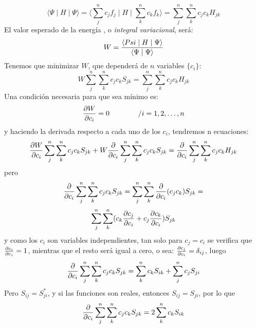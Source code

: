 \documentclass[a4paper,openright,12pt, oneside]{book}
\newcommand{\prointerno}[2]{\langle #1 \mid #2 \rangle}
\newcommand{\prointernot}[3]{\langle #1 \mid #2 \mid #3 \rangle}
\begin{document}
\begin{displaymath}
\prointernot{\Psi}{H}{\Psi} = \prointernot{\sum^{n}_{j} c_{j}f_{j}}{H} {\sum^{n}_{k} c_{k}f_{k}} = \sum^{n}_{j} \sum^{n}_{k} c_{j} c_{k} H_{jk}
\end{displaymath}
El valor esperado de la energ\'ia , o \emph{integral variacional}, ser\'a:
\begin{displaymath}W = { \prointernot{Psi}{H}{\Psi} \over \prointerno{\Psi}{\Psi} } \end{displaymath}
Tenemos que minimizar $W$, que depender\'a de $n$ variables $\{c_{i}\}$:
\begin{displaymath}W \sum^{n}_{j} \sum^{n}_{k} c_{j} c_{k} S_{jk} = \sum^{n}_{j}
\sum^{n}_{k} c_{j} c_{k} H_{jk} \end{displaymath}
Una condici\'on necesaria para que sea m\'inimo es:
\begin{displaymath}{\partial W\over \partial c_{i}} = 0 \qquad \qquad / i = 1,2,\ldots ,n \end{displaymath}
y haciendo la derivada respecto a cada uno de los $c_{i}$, tendremos n ecuaciones:
\begin{displaymath}{
    {\partial W \over \partial c_{i}} \sum^{n}_{j} \sum^{n}_{k} c_j c_k S_{jk} + W {\partial \over \partial c_{i}}}
\sum^{n}_{j} \sum^{n}_{k} c_{j} c_{k} S_{jk} =  {{ \partial \over \partial c_i} \sum^{n}_{j} \sum^{n}_{k} c_{j} c_{k} H_{jk}}
\end{displaymath}
pero
\begin{displaymath}
{\partial \over \partial c_{i}} \sum^{n}_{j} \sum^{n}_{k} c_{j} c_{k}
S_{jk} = \sum^{n}_{j} \sum^{n}_{k} {\partial \over \partial c_{i}}
(c_{j} c_{k}) S_{jk} =
\end{displaymath}
\begin{displaymath}
\sum^{n}_{j} \sum^{n}_{k} (c_{k}{\partial c_j\over \partial c_{i}}
+ c_{j} {\partial c_k\over \partial c_{i}} ) S_{jk}
\end{displaymath}
y como los $c_{i}$ son variables independientes, tan solo para $c_{j}=c_{i}$ se verifica que  ${\partial c_i\over \partial c_i} =
1$, mientras que el resto ser\'a igual a cero, o sea:  ${\partial
c_j\over \partial c_i} = \delta _{ij}$, luego
\begin{displaymath}
{\partial \over \partial c_{i}} \sum^{n}_{j} \sum^{n}_{k} c_{j} c_{k}
S_{jk} = \sum^{n}_{k} c_{k} S_{ik} + \sum^{n}_{j} c_{j} S_{ji}
\end{displaymath}
Pero  $S_{ij} = S^{*}_{ji}$, y si las funciones son reales, entonces $S_{ij}=S_{ji}$, por lo que
\begin{displaymath}{\partial \over \partial c_{i}} \sum^{n}_{j} \sum^{n}_{k} c_{j} c_{k}
S_{jk} = 2 \sum^{n}_{k} c_{k} S_{ik} \end{displaymath}
\end{document}

